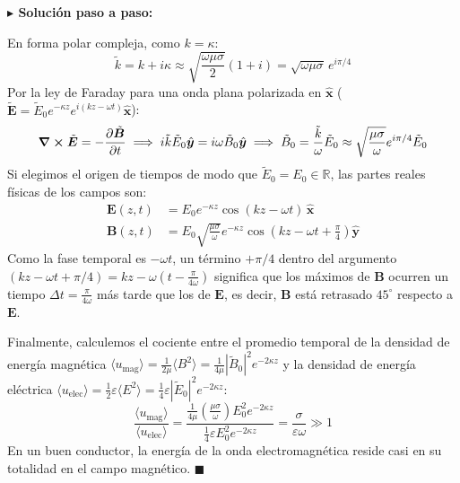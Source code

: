 \documentclass[11pt,a4paper]{book}
\newenvironment{solucion}{%
    \par\medskip\noindent\textbf{\color{blue!65!black}\Large $\blacktriangleright$ Solución paso a paso:}\par\medskip
}{%
    \hfill$\blacksquare$\par\bigskip
}
\newcommand{\xhat}{\hat{\bm{x}}}
\newcommand{\yhat}{\hat{\bm{y}}}
\newcommand{\Evec}{\bm{E}}
\newcommand{\Bvec}{\bm{B}}
\begin{document}
\begin{solucion}
En forma polar compleja, como $k = \kappa$:
\begin{equation}
    \tilde{k} = k + i\kappa \approx \sqrt{\frac{\omega\mu\sigma}{2}}(1 + i) = \sqrt{\omega\mu\sigma}\,e^{i\pi/4}
\end{equation}
Por la ley de Faraday para una onda plana polarizada en $\xhat$ ($\tilde{\Evec} = \tilde{E}_0 e^{-\kappa z} e^{i(kz - \omega t)}\xhat$):
\begin{equation}
    \curl{\tilde{\Evec}} = -\pdv{\tilde{\Bvec}}{t} \implies i\tilde{k}\tilde{E}_0\yhat = i\omega\tilde{B}_0\yhat \implies \tilde{B}_0 = \frac{\tilde{k}}{\omega}\tilde{E}_0 \approx \sqrt{\frac{\mu\sigma}{\omega}} e^{i\pi/4} \tilde{E}_0
\end{equation}
Si elegimos el origen de tiempos de modo que $\tilde{E}_0 = E_0 \in \mathbb{R}$, las partes reales físicas de los campos son:
\begin{align}
    \Evec(z,t) &= E_0 e^{-\kappa z} \cos(kz - \omega t)\,\xhat \\
    \Bvec(z,t) &= E_0 \sqrt{\frac{\mu\sigma}{\omega}} e^{-\kappa z} \cos\left(kz - \omega t + \frac{\pi}{4}\right)\yhat
\end{align}
Como la fase temporal es $-\omega t$, un término $+\pi/4$ dentro del argumento $(kz - \omega t + \pi/4) = kz - \omega(t - \frac{\pi}{4\omega})$ significa que los máximos de $\Bvec$ ocurren un tiempo $\Delta t = \frac{\pi}{4\omega}$ más tarde que los de $\Evec$, es decir, $\Bvec$ está retrasado $45^\circ$ respecto a $\Evec$.

Finalmente, calculemos el cociente entre el promedio temporal de la densidad de energía magnética $\langle u_{\text{mag}} \rangle = \frac{1}{2\mu}\langle B^2 \rangle = \frac{1}{4\mu}|\tilde{B}_0|^2 e^{-2\kappa z}$ y la densidad de energía eléctrica $\langle u_{\text{elec}} \rangle = \frac{1}{2}\varepsilon\langle E^2 \rangle = \frac{1}{4}\varepsilon|\tilde{E}_0|^2 e^{-2\kappa z}$:
\begin{equation}
    \frac{\langle u_{\text{mag}} \rangle}{\langle u_{\text{elec}} \rangle} = \frac{\frac{1}{4\mu} \left(\frac{\mu\sigma}{\omega}\right) E_0^2 e^{-2\kappa z}}{\frac{1}{4}\varepsilon E_0^2 e^{-2\kappa z}} = \frac{\sigma}{\varepsilon\omega} \gg 1
\end{equation}
En un buen conductor, la energía de la onda electromagnética reside casi en su totalidad en el campo magnético.
\end{solucion}

\end{document}
